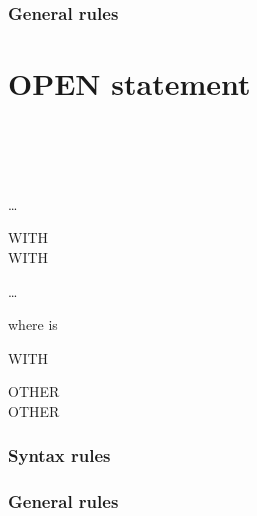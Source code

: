 \subsubsection{General rules}

\section{OPEN statement}

\begin{syntax}
  \begin{1=}
    \begin{1=}
       \\
       \\
       \\
    \end{1=}
    \begin{0-1}
    \end{0-1}
    \begin{0-1}
    \end{0-1}
    \begin{1=}
      \filename
    \end{1=} \ldots
    \begin{0-1}
      WITH   \\
      WITH  \\
    \end{0-1}
  \end{1=}\ldots
\end{syntax}

where  is

\begin{syntax}
   WITH
  \begin{1=}
     OTHER \\
     OTHER \\
     
  \end{1=}
\end{syntax}

\subsubsection{Syntax rules}

\subsubsection{General rules}

